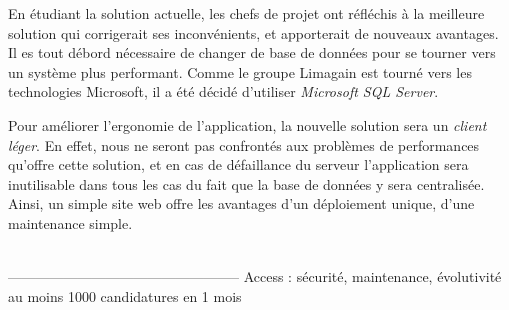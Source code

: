 En étudiant la solution actuelle, les chefs de projet ont réfléchis à la meilleure solution qui corrigerait ses inconvénients, et apporterait de nouveaux avantages.
\\

Il es tout débord nécessaire de changer de base de données pour se tourner vers un système plus performant. Comme le groupe Limagain est tourné vers les technologies Microsoft, il a été décidé d'utiliser \textit{Microsoft SQL Server}.

Pour améliorer l'ergonomie de l'application, la nouvelle solution sera un \textit{client léger}. En effet, nous ne seront pas confrontés aux problèmes de performances qu'offre cette solution, et en cas de défaillance du serveur l'application sera inutilisable dans tous les cas du fait que la base de données y sera centralisée. Ainsi, un simple site web offre les avantages d'un déploiement unique, d'une maintenance simple.

~~\\--------------------------------------------------
Access : sécurité, maintenance, évolutivité
au moins 1000 candidatures en 1 mois